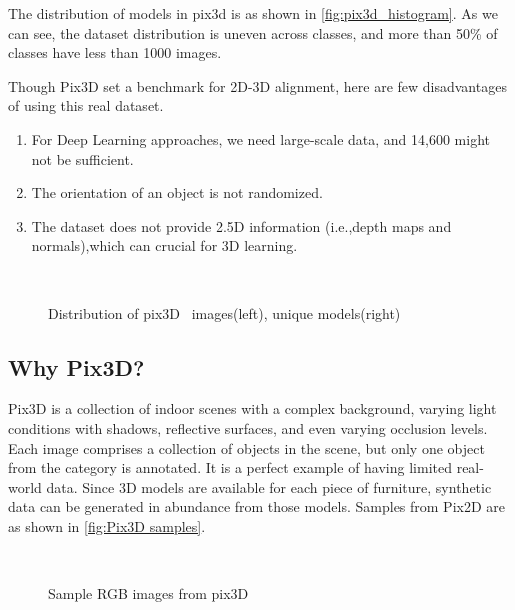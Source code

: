 The distribution of models in pix3d is as shown in \autoref{fig:pix3d_histogram}.
As we can see, the dataset distribution is uneven across classes, and more than 50\% of classes have less than 1000 images.

Though Pix3D set a benchmark for 2D-3D alignment, here are few disadvantages of using this real dataset.
\begin{enumerate}
    \item For Deep Learning approaches, we need large-scale data, and 14,600 might not be sufficient.
    \item The orientation of an object is not randomized.
    \item The dataset does not provide 2.5D information (i.e.,depth maps and normals),which can crucial for 3D learning.
\end{enumerate}

\begin{figure}[!ht]
    \centering
    \quad
    \\
    \caption{Distribution of pix3D~\cite{pix3d} images(left), unique models(right)}
    \label{fig:pix3d_histogram}
\end{figure}

\subsection{Why Pix3D?}\label{subsec:why-pix3d?}
Pix3D is a collection of indoor scenes with a complex background, varying light conditions with shadows, reflective surfaces, and even varying occlusion levels.
Each image comprises a collection of objects in the scene, but only one object from the category is annotated.
It is a perfect example of having limited real-world data.
Since 3D models are available for each piece of furniture, synthetic data can be generated in abundance from those models.
Samples from Pix2D are as shown in \autoref{fig:Pix3D samples}.

\begin{figure}[!ht]
    \centering
    \quad
    \\
    \quad
    \caption{Sample RGB images from pix3D}
    \label{fig:Pix3D samples}
\end{figure}

